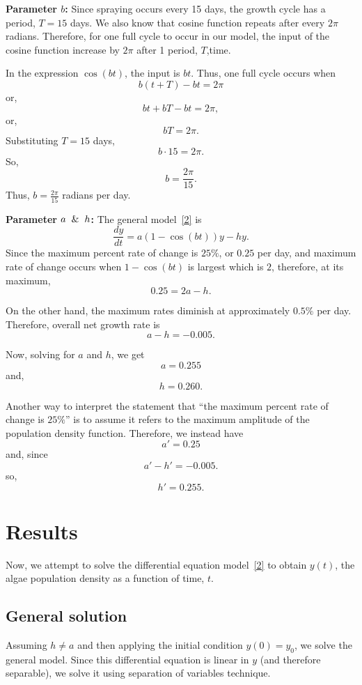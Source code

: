 \documentclass[11pt]{article}
\begin{document}
\textbf{Parameter $b$:} Since spraying occurs every 15 days, the growth cycle has a period, $T = 15$ days. We also know that cosine function repeats after every $2\pi$ radians. Therefore, for one full cycle to occur in our model, the input of the cosine function increase by $2\pi$ after 1 period, $T$,time.

In the expression $\cos(bt)$, the input is $bt$. Thus, one full cycle occurs when
\[
b(t+T) - bt = 2\pi
\]
or,
\[
bt + bT - bt = 2\pi,
\]
or,
\[
bT = 2\pi.
\]
Substituting $T = 15$ days,
\[
b\cdot15 = 2\pi.
\]
So,
\[
b = \frac{2\pi}{15}.
\]
Thus, $b = \frac{2\pi}{15}$ radians per day.

\textbf{Parameter $a \And h$:} The general model~\ref{2} is
\begin{equation}
    \frac{dy}{dt} = a(1 - \cos(bt))y - hy.
\end{equation}
Since the maximum percent rate of change is $25\%$, or $0.25$ per day, and maximum rate of change occurs when $1 - \cos(bt)$ is largest which is $2$, therefore, at its maximum, 
\[
0.25 = 2a - h.
\]

On the other hand, the maximum rates diminish at approximately $0.5\%$ per day. Therefore, overall net growth rate is
\[
a - h = -0.005.
\]

Now, solving for $a$ and $h$, we get
\[
a = 0.255
\]
and,
\[
h = 0.260.
\]

Another way to interpret the statement that ``the maximum percent rate of change is $25\%$'' is to assume it refers to the maximum amplitude of the population density function. Therefore, we instead have
\[
a' = 0.25
\]
and, since
\[
a' - h' = -0.005.
\]
so,
\[
h' = 0.255.
\]

\section{Results}

Now, we attempt to solve the differential equation model~\ref{2} to obtain $y(t)$, the algae population density as a function of time, $t$.

\subsection{General solution}

Assuming $h \ne a$ and then applying the initial condition $y(0)=y_0$, we solve the general model. Since this differential equation is linear in $y$ (and therefore separable), we solve it using separation of variables technique.
\end{document}
